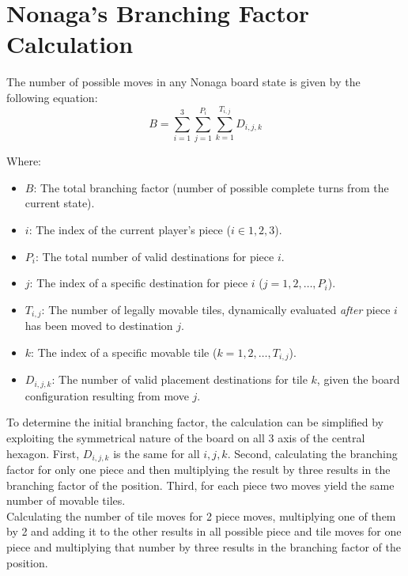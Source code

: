 
\chapter{Nonaga's Branching Factor Calculation} \label{branching}
The number of possible moves in any Nonaga board state is given by the following equation: \\
\begin{equation}
B = \sum_{i=1}^{3} \sum_{j=1}^{P_i} \sum_{k=1}^{T_{i,j}} D_{i,j,k}
\label{eq:branching_factor_detailed}
\end{equation}

Where:
\begin{itemize}
    \item $B$: The total branching factor (number of possible complete turns from the current state).
    \item $i$: The index of the current player's piece ($i \in {1, 2, 3}$).
    \item $P_i$: The total number of valid destinations for piece $i$.
    \item $j$: The index of a specific destination for piece $i$ ($j = 1, 2, \dots, P_i$).
    \item $T_{i,j}$: The number of legally movable tiles, dynamically evaluated \textit{after} piece $i$ has been moved to destination $j$.
    \item $k$: The index of a specific movable tile ($k = 1, 2, \dots, T_{i,j}$).
    \item $D_{i,j,k}$: The number of valid placement destinations for tile $k$, given the board configuration resulting from move $j$.
\end{itemize}
To determine the initial branching factor, the calculation can be simplified by exploiting the symmetrical nature of the board on all 3 axis of the central hexagon. First, $D_{i,j,k}$ is the same for all $i,j,k$. Second, calculating the branching factor for only one piece and then multiplying the result by three results in the branching factor of the position. Third, for each piece two moves yield the same number of movable tiles.\\
Calculating the number of tile moves for 2 piece moves, multiplying one of them by 2 and adding it to the other results in all possible piece and tile moves for one piece and multiplying that number by three results in the branching factor of the position.
